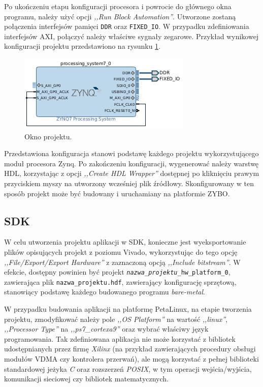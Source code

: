 Po ukończeniu etapu konfiguracji procesora i powrocie do głównego okna programu, należy użyć opcji \emph{,,Run Block Automation''}. 
Utworzone zostaną połączenia interfejsów pamięci \texttt{DDR} oraz \texttt{FIXED\_IO}.
W przypadku zdefiniowania interfejsów AXI, połączyć należy właściwe sygnały zegarowe. 
Przykład wynikowej konfiguracji projektu przedstawiono na rysunku \ref{fig:vivado-config-result}.

	\begin{figure}[ht]
		\centering
		\includegraphics[]{img/vivado/vivado-config-result.png}
		\caption{Okno projektu.}
		\label{fig:vivado-config-result}
	\end{figure}
	
Przedstawiona konfiguracja stanowi podstawę każdego projektu wykorzystującego moduł procesora Zynq.
Po zakończeniu konfiguracji, wygenerować należy warstwę HDL, korzystając z opcji \emph{,,Create HDL Wrapper''} dostępnej po kliknięciu prawym przyciskiem myszy na utworzony wcześniej plik źródłowy.
Skonfigurowany w ten sposób projekt może być budowany i uruchamiany na platformie ZYBO.

\subsection{SDK}

W celu utworzenia projektu aplikacji w SDK, konieczne jest wyeksportowanie plików opisujących projekt z poziomu Vivado, wykorzystując do tego opcję \emph{,,File/Export/Export Hardware''} z zaznaczoną opcją \emph{,,Include bitstream''}.
W efekcie, dostępny powinien być projekt \texttt{\textit{nazwa\_projektu}\_hw\_platform\_0}, zawierająca plik \texttt{nazwa\_projektu.hdf}, zawierający konfigurację sprzętową, stanowiący podstawę każdego budowanego programu \textit{bare-metal}. 

W przypadku budowania aplikacji na platformę PetaLinux, na etapie tworzenia projektu, zmodyfikować należy pole \emph{,,OS Platform''} na wartość \emph{,,linux''}, \emph{,,Processor Type''} na \emph{,,ps7\_cortexa9''} oraz wybrać właściwy język programowania.
Tak zdefiniowana aplikacja nie może korzystać z bibliotek udostępnianych przez firmę \emph{Xilinx} (na przykład zawierających procedury obsługi modułów VDMA czy kontrolera przerwań), ale mogą korzystać z pełnej biblioteki standardowej jeżyka \emph{C} oraz rozszerzeń \emph{POSIX}, w tym operacji wejścia/wyjścia, komunikacji sieciowej czy bibliotek matematycznych.


